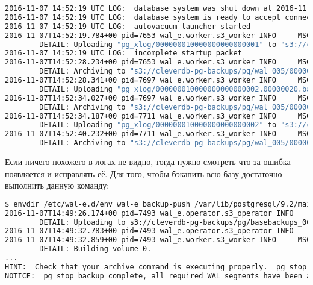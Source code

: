\begin{lstlisting}[language=Bash,label=lst:wal-e8,caption=Логи PostgreSQL]
2016-11-07 14:52:19 UTC LOG:  database system was shut down at 2016-11-07 14:51:40 UTC
2016-11-07 14:52:19 UTC LOG:  database system is ready to accept connections
2016-11-07 14:52:19 UTC LOG:  autovacuum launcher started
2016-11-07T14:52:19.784+00 pid=7653 wal_e.worker.s3_worker INFO     MSG: begin archiving a file
        DETAIL: Uploading "pg_xlog/000000010000000000000001" to "s3://cleverdb-pg-backups/pg/wal_005/000000010000000000000001.lzo".
2016-11-07 14:52:19 UTC LOG:  incomplete startup packet
2016-11-07T14:52:28.234+00 pid=7653 wal_e.worker.s3_worker INFO     MSG: completed archiving to a file
        DETAIL: Archiving to "s3://cleverdb-pg-backups/pg/wal_005/000000010000000000000001.lzo" complete at 21583.3KiB/s.
2016-11-07T14:52:28.341+00 pid=7697 wal_e.worker.s3_worker INFO     MSG: begin archiving a file
        DETAIL: Uploading "pg_xlog/000000010000000000000002.00000020.backup" to "s3://cleverdb-pg-backups/pg/wal_005/000000010000000000000002.00000020.backup.lzo".
2016-11-07T14:52:34.027+00 pid=7697 wal_e.worker.s3_worker INFO     MSG: completed archiving to a file
        DETAIL: Archiving to "s3://cleverdb-pg-backups/pg/wal_005/000000010000000000000002.00000020.backup.lzo" complete at 00KiB/s.
2016-11-07T14:52:34.187+00 pid=7711 wal_e.worker.s3_worker INFO     MSG: begin archiving a file
        DETAIL: Uploading "pg_xlog/000000010000000000000002" to "s3://cleverdb-pg-backups/pg/wal_005/000000010000000000000002.lzo".
2016-11-07T14:52:40.232+00 pid=7711 wal_e.worker.s3_worker INFO     MSG: completed archiving to a file
        DETAIL: Archiving to "s3://cleverdb-pg-backups/pg/wal_005/000000010000000000000002.lzo" complete at 2466.67KiB/s.
\end{lstlisting}

Если ничего похожего в логах не видно, тогда нужно смотреть что за ошибка появляется и исправлять её. Для того, чтобы бэкапить всю базу достаточно выполнить данную команду:

\begin{lstlisting}[language=Bash,label=lst:wal-e9,caption=Загрузка бэкапа всей базы данных в S3]
$ envdir /etc/wal-e.d/env wal-e backup-push /var/lib/postgresql/9.2/main
2016-11-07T14:49:26.174+00 pid=7493 wal_e.operator.s3_operator INFO     MSG: start upload postgres version metadata
        DETAIL: Uploading to s3://cleverdb-pg-backups/pg/basebackups_005/base_000000010000000000000006_00000032/extended_version.txt.
2016-11-07T14:49:32.783+00 pid=7493 wal_e.operator.s3_operator INFO     MSG: postgres version metadata upload complete
2016-11-07T14:49:32.859+00 pid=7493 wal_e.worker.s3_worker INFO     MSG: beginning volume compression
        DETAIL: Building volume 0.
...
HINT:  Check that your archive_command is executing properly.  pg_stop_backup can be canceled safely, but the database backup will not be usable without all the WAL segments.
NOTICE:  pg_stop_backup complete, all required WAL segments have been archived
\end{lstlisting}

